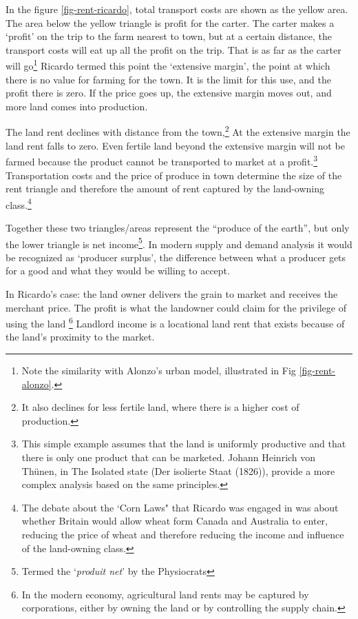 In the figure \ref{fig-rent-ricardo}, total transport costs are shown as the yellow area. The area below the yellow triangle is profit for the carter. The carter makes a `profit' on the trip to the farm nearest to town, but at a certain distance, the transport costs will eat up all the profit on the trip. That is as far as the carter will go\footnote{Note the similarity with Alonzo's urban model, illustrated in Fig \ref{fig-rent-alonzo}.}
Ricardo termed this point the `extensive margin', the point at which there is no value for farming for the town. It is the limit for this use, and the profit there is zero. If the price goes up, the extensive margin moves out, and more land comes into production.

The land rent declines with distance from the town,\footnote{It also declines for less fertile land, where there is a higher cost of production.} At the extensive margin the land rent falls to zero. Even fertile land beyond the extensive margin will not be farmed because the product cannot be transported to market at a profit.\footnote{This simple example assumes that the land is uniformly productive and that there is only one product that can be marketed. Johann Heinrich von Th\"unen, in The Isolated state (Der isolierte Staat (1826)), provide a more complex analysis based on the same principles.} Transportation costs and the price of produce in town determine the size of the  rent triangle and therefore the amount of rent captured by the land-owning class.\footnote{The debate about the  `Corn Laws" that Ricardo  was engaged in was about whether Britain would allow wheat form Canada and Australia to enter, reducing the price of wheat and therefore reducing the income and influence of the land-owning class.} 

Together these two triangles/areas represent the ``produce of the earth'', but only the lower triangle is net income\footnote{ Termed the `\textit{produit net}' by the Physiocrats}. In modern supply and demand analysis it would be recognized as `producer surplus', the difference between what a producer gets for a good and what they would be willing to accept.

In Ricardo's case: the land owner delivers the grain to market and receives the merchant price. The profit is what the landowner could claim for the privilege of using the land %
\footnote{In the modern economy, agricultural land rents may be captured by corporations,  either by owning the land or by controlling the supply chain.}  Landlord income is a locational land rent that exists because of the land's proximity to the market. 
 

